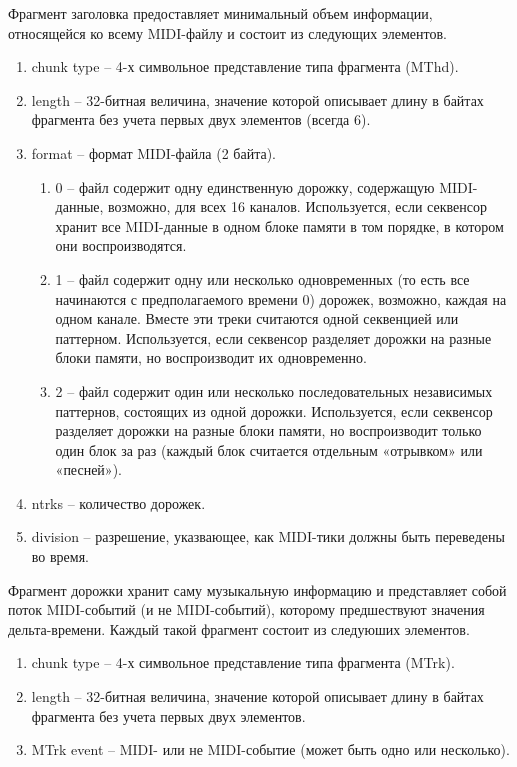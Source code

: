 Фрагмент заголовка предоставляет минимальный объем информации, относящейся ко всему MIDI-файлу и состоит из следующих элементов.
\begin{enumerate}
\item chunk type -- 4-х символьное представление типа фрагмента (MThd).
\item length -- 32-битная величина, значение которой описывает длину в байтах фрагмента без учета первых двух элементов (всегда 6).
\item format -- формат MIDI-файла (2 байта).
\begin{enumerate}
\item 0 -- файл содержит одну единственную дорожку, содержащую MIDI-данные, возможно, для всех 16 каналов. Используется, если секвенсор хранит все  MIDI-данные в одном блоке памяти в том порядке, в котором они воспроизводятся.
\item 1 -- файл содержит одну или несколько одновременных (то есть все начинаются с предполагаемого времени 0) дорожек, возможно, каждая на одном канале. Вместе эти треки считаются одной секвенцией или паттерном. Используется, если  секвенсор разделяет дорожки на разные блоки памяти, но воспроизводит их одновременно.
\item 2 -- файл содержит один или несколько последовательных независимых паттернов, состоящих из одной дорожки. Используется, если секвенсор разделяет дорожки на разные блоки памяти, но воспроизводит только один блок за раз (каждый блок считается отдельным «отрывком» или «песней»).
\end{enumerate}
\item ntrks -- количество дорожек.
\item division -- разрешение, указвающее, как MIDI-тики должны быть переведены во время.
\end{enumerate}

Фрагмент дорожки хранит саму музыкальную информацию и представляет собой поток MIDI-событий (и не MIDI-событий), которому предшествуют значения дельта-времени. 
Каждый такой фрагмент состоит из следуюших элементов.
\begin{enumerate}
\item chunk type -- 4-х символьное представление типа фрагмента (MTrk).
\item length -- 32-битная величина, значение которой описывает длину в байтах фрагмента без учета первых двух элементов.
\item MTrk event -- MIDI- или не MIDI-событие (может быть одно или несколько).
\end{enumerate}

